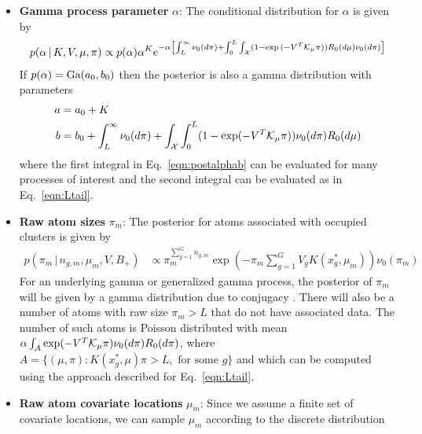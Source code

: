 \begin{itemize}
  \item \textbf{Gamma process parameter} $\alpha$: The conditional distribution 
  for $\alpha$ is given by
  \begin{equation}
    \begin{aligned}
      p(\alpha \, | \, K, V, \mu,\pi) \propto p(\alpha)\alpha^K 
       e^{ -\alpha \left [ \int_L^\infty \nu_0(d\pi) + 
        \int_0^L \int_{\mathcal{X}} (1-\exp{(-V^T \mathcal{K}_\mu\pi)}) R_0(d\mu) \nu_0(d\pi) \right ] }
    \end{aligned}
  \end{equation}
  If $p(\alpha) = \text{Ga}(a_0,b_0)$ then the posterior is also a gamma
  distribution with parameters
  \begin{align}
    \label{eqn:postalphaa}
    a &= a_0 + K \\
    b &= b_0 + \int_L^\infty \nu_0(d\pi) + 
    \int_{\mathcal{X}} \int_0^L (1-\exp(-V^T \mathcal{K}_\mu\pi))\nu_0(d\pi)  R_0(d\mu)
    \label{eqn:postalphab}
  \end{align}
  where the first integral in Eq.~\ref{eqn:postalphab} can be 
  evaluated for many processes of interest and the second integral can be
  evaluated as in Eq.~\ref{eqn:Ltail}.
  \item \textbf{Raw atom sizes} $\pi_m$: The posterior for atoms associated with 
    occupied clusters is given by
    \begin{align}
      p(\pi_m \, | \, n_{g,m}, \mu_m, V, B_+) &\propto\pi_m^{\sum_{g=1}^G n_{g,m}} \exp \left (
      -\pi_m \sum_{g=1}^G V_gK(x^*_g,\mu_m) \right )
      \nu_0(\pi_m)
      \label{eqn:pipost}
    \end{align}
    For an underlying gamma or generalized gamma process, the posterior of
    $\pi_m$ will be given by a gamma distribution due to conjugacy
    \cite{GriffinWalker:2011}.
    There will also be a number of atoms with raw size $\pi_m>L$ that do not have
    associated data. The number of such atoms is Poisson distributed with mean 
    $\alpha \int_A \exp ( -V^T \mathcal{K}_\mu \pi)\nu_0(d\pi)R_0(d\pi)$, where 
    $A = \{(\mu,\pi) : K(x^*_g,\mu)\pi > L, \text{ for some } g\}$ and which can be 
    computed using the approach described for Eq.~\ref{eqn:Ltail}.
  \item \textbf{Raw atom covariate locations} $\mu_m$: Since we assume a finite set 
    of covariate locations, we can sample $\mu_m$ according to the discrete 
    distribution

\end{itemize}
